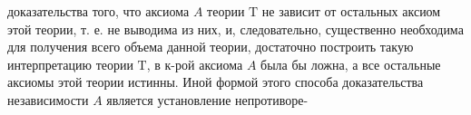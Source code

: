 \documentclass[10pt]{article}
\begin{document}
доказательства того, что аксиома $A$ теории $\mathrm{T}$ не зависит от остальных аксиом этой теории, т. е. не выводима из них, и, следовательно, существенно необходима для получения всего объема данной теории, достаточно построить такую интерпретацию теории $\mathrm{T}$, в к-рой аксиома $A$ была бы ложна, а все остальные аксиомы этой теории истинны. Иной формой этого способа доказательства независимости $A$ является установление непротиворе-
\end{document}
